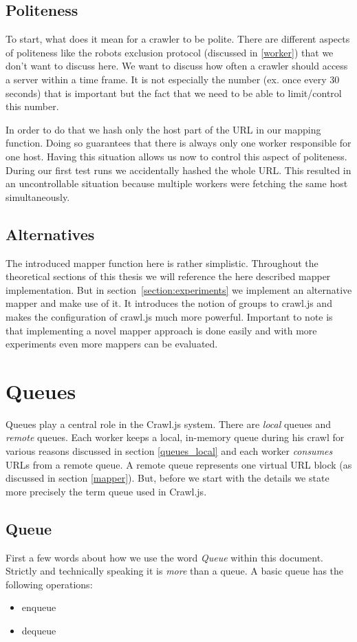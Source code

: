 \subsection{Politeness}
To start, what does it mean for a crawler to be polite. There are different aspects of politeness like the robots exclusion protocol (discussed in \ref{worker}) that we don't want to discuss here. We want to discuss how often a crawler should access a server within a time frame. It is not especially the number (ex. once every 30 seconds) that is important but the fact that we need to be able to limit/control this number.

In order to do that we hash only the host part of the URL in our mapping function. Doing so guarantees that there is always only one worker responsible for one host. Having this situation allows us now to control this aspect of politeness.
During our first test runs we accidentally hashed the whole URL. This resulted in an uncontrollable situation because multiple workers were fetching the same host simultaneously.

\subsection{Alternatives}
The introduced mapper function here is rather simplistic. Throughout the theoretical sections of this thesis we will reference the here described mapper implementation. But in section~\ref{section:experiments} we implement an alternative mapper and make use of it. It introduces the notion of groups to crawl.js and makes the configuration of crawl.js much more powerful. Important to note is that implementing a novel mapper approach is done easily and with more experiments even more mappers can be evaluated.

\section{Queues}
Queues play a central role in the Crawl.js system. There are \emph{local} queues and \emph{remote} queues. Each worker keeps a local, in-memory queue during his crawl for various reasons discussed in section \ref{queues_local} and each worker \emph{consumes} URLs from a remote queue. A remote queue represents one virtual URL block (as discussed in section \ref{mapper}). But, before we start with the details we state more precisely the term queue used in Crawl.js.

\subsection{Queue}
First a few words about how we use the word \emph{Queue} within this document. Strictly and technically speaking it is \emph{more} than a queue. A basic queue has the following operations:
\begin{itemize}
  \item enqueue
  \item dequeue
\end{itemize}

